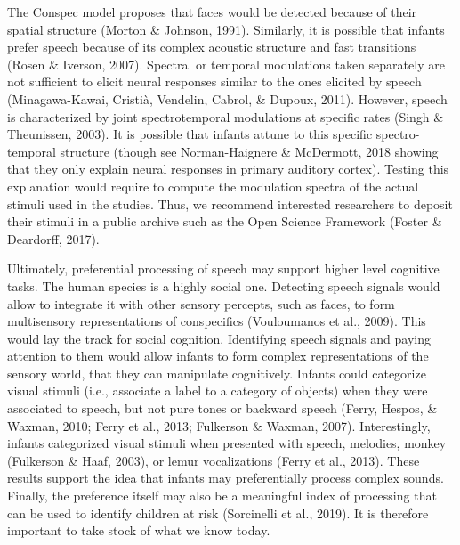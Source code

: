 \documentclass[man]{apa6}
\begin{document}
The Conspec model proposes that faces would be detected because of their
spatial structure (Morton \& Johnson, 1991). Similarly, it is possible
that infants prefer speech because of its complex acoustic structure and
fast transitions (Rosen \& Iverson, 2007). Spectral or temporal
modulations taken separately are not sufficient to elicit neural
responses similar to the ones elicited by speech (Minagawa-Kawai,
Cristià, Vendelin, Cabrol, \& Dupoux, 2011). However, speech is
characterized by joint spectrotemporal modulations at specific rates
(Singh \& Theunissen, 2003). It is possible that infants attune to this
specific spectro-temporal structure (though see Norman-Haignere \&
McDermott, 2018 showing that they only explain neural responses in
primary auditory cortex). Testing this explanation would require to
compute the modulation spectra of the actual stimuli used in the
studies. Thus, we recommend interested researchers to deposit their
stimuli in a public archive such as the Open Science Framework (Foster
\& Deardorff, 2017).

Ultimately, preferential processing of speech may support higher level
cognitive tasks. The human species is a highly social one. Detecting
speech signals would allow to integrate it with other sensory percepts,
such as faces, to form multisensory representations of conspecifics
(Vouloumanos et al., 2009). This would lay the track for social
cognition. Identifying speech signals and paying attention to them would
allow infants to form complex representations of the sensory world, that
they can manipulate cognitively. Infants could categorize visual stimuli
(i.e., associate a label to a category of objects) when they were
associated to speech, but not pure tones or backward speech (Ferry,
Hespos, \& Waxman, 2010; Ferry et al., 2013; Fulkerson \& Waxman, 2007).
Interestingly, infants categorized visual stimuli when presented with
speech, melodies, monkey (Fulkerson \& Haaf, 2003), or lemur
vocalizations (Ferry et al., 2013). These results support the idea that
infants may preferentially process complex sounds. Finally, the
preference itself may also be a meaningful index of processing that can
be used to identify children at risk (Sorcinelli et al., 2019). It is
therefore important to take stock of what we know today.
\end{document}
